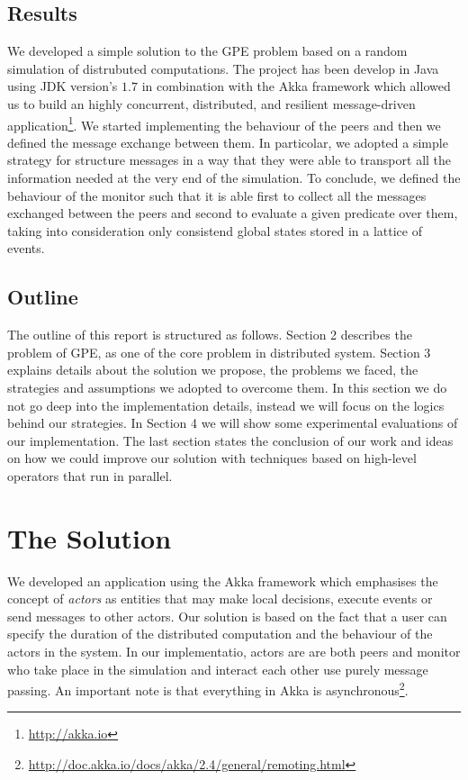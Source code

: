 \documentclass[10pt]{article}
\begin{document}
\subsection{Results}

We developed a simple solution to the GPE problem based on a random simulation of distrubuted computations. The project has been develop in Java using JDK version's $1.7$ in combination with the Akka framework which allowed us to build an highly concurrent, distributed, and resilient message-driven application\footnote{\url{http://akka.io}}. We started implementing the behaviour of the peers and then we defined the message exchange between them. In particolar, we adopted a simple strategy for structure messages in a way that they were able to transport all the information needed at the very end of the simulation. To conclude, we defined the behaviour of the monitor such that it is able first to collect all the messages exchanged between the peers and second to evaluate a given predicate over them, taking into consideration only consistend global states stored in a lattice of events.

\subsection{Outline}

The outline of this report is structured as follows. Section 2 describes the problem of GPE, as one of the core problem in distributed system. Section 3 explains details about the solution we propose, the problems we faced, the strategies and assumptions we adopted to overcome them. In this section we do not go deep into the implementation details, instead we will focus on the logics behind our strategies. In Section 4 we will show some experimental evaluations of our implementation. The last section states the conclusion of our work and ideas on how we could improve our solution with techniques based on high-level operators that run in parallel.

\section{The Solution}

We developed an application using the Akka framework which emphasises the concept of \textit{actors} as entities that may make local decisions, execute events or send messages to other actors. Our solution is based on the fact that a user can specify the duration of the distributed computation and the behaviour of the actors in the system. In our implementatio, actors are are both peers and monitor who take place in the simulation and interact each other use purely message passing. An important note is that everything in Akka is asynchronous\footnote{\url{http://doc.akka.io/docs/akka/2.4/general/remoting.html}}.
\end{document}
